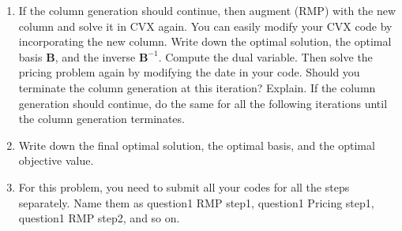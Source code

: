 \documentclass[11pt]{article}
\newcommand{\mb}[1]{\ensuremath{\boldsymbol{#1}}}
\begin{document}
\begin{enumerate}
\color{black}
\item If the column generation should continue, then augment (RMP) with the new column and solve it in CVX again. You can easily modify your CVX code by incorporating the new column. Write down the optimal solution, the optimal basis $\mb{B}$, and the inverse $\mb{B}^{-1}$. Compute the dual
variable. Then solve the pricing problem again by modifying the date in your code. Should you terminate the column generation at this iteration? Explain. If the column generation should continue, do the same for all the following iterations until the column generation terminates.

\color{black}
\item Write down the final optimal solution, the optimal basis, and the optimal objective value.

\color{black}
\item For this problem, you need to submit all your codes for all the steps separately. Name them as question1 RMP step1, question1 Pricing step1, question1 RMP step2, and so on.


\end{enumerate}
\end{document}
